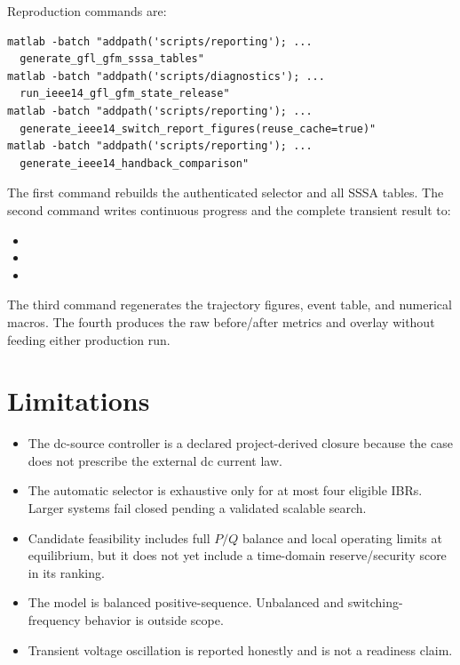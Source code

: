 \documentclass[12pt,a4paper]{article}
\begin{document}
Reproduction commands are:
\begin{verbatim}
matlab -batch "addpath('scripts/reporting'); ...
  generate_gfl_gfm_sssa_tables"
matlab -batch "addpath('scripts/diagnostics'); ...
  run_ieee14_gfl_gfm_state_release"
matlab -batch "addpath('scripts/reporting'); ...
  generate_ieee14_switch_report_figures(reuse_cache=true)"
matlab -batch "addpath('scripts/reporting'); ...
  generate_ieee14_handback_comparison"
\end{verbatim}
The first command rebuilds the authenticated selector and all SSSA tables. The second command
writes continuous progress and the complete transient result to:
\begin{itemize}
\item {}
\item {}
\item {}
\end{itemize}
The third command regenerates the trajectory figures, event table, and numerical macros. The
fourth produces the raw before/after metrics and overlay without feeding either production run.

\section{Limitations}

\begin{itemize}
\item The dc-source controller is a declared project-derived closure because the case does not
prescribe the external dc current law.
\item The automatic selector is exhaustive only for at most four eligible IBRs. Larger systems
fail closed pending a validated scalable search.
\item Candidate feasibility includes full $P/Q$ balance and local operating limits at equilibrium,
but it does not yet include a time-domain reserve/security score in its ranking.
\item The model is balanced positive-sequence. Unbalanced and switching-frequency behavior is
outside scope.
\item Transient voltage oscillation is reported honestly and is not a readiness claim.
\end{itemize}
\end{document}
